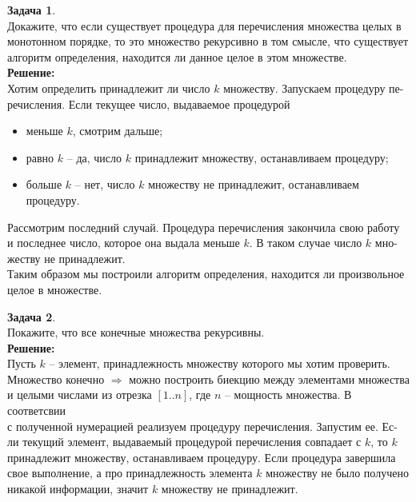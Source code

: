 \documentclass[a4paper,12pt]{article}
\theoremstyle{definition} %
\theoremstyle{definition} %
\newtheorem{problem}{Задача}[section]
\theoremstyle{remark} %
\begin{document}
\begin{problem}\ \\[1ex]
	Докажите, что если существует процедура для перечисления множества целых в \\[1ex] 
	монотонном порядке, то это множество рекурсивно в том смысле, что существует \\[1ex]
	алгоритм определения, находится ли данное целое в
	этом множестве. \\[2ex]
	
	\textbf{Решение:} \\[2ex]
	Хотим определить принадлежит ли число $k$ множеству. Запускаем процедуру пе- \\[1ex]
	речисления. Если текущее число, выдаваемое процедурой 
	\begin{itemize}
		\item меньше $k$, смотрим дальше;
		\item равно $k$ -- да, число $k$ принадлежит множеству, останавливаем процедуру;
		\item больше $k$ -- нет, число $k$ множеству не принадлежит, останавливаем процедуру.
	\end{itemize}
	Рассмотрим последний случай. Процедура перечисления закончила свою работу \\[1ex]
	и последнее число, которое она выдала меньше $k$. В таком случае число $k$ мно- \\[1ex]
	жеству не принадлежит. \\[1ex]
	Таким образом мы построили алгоритм определения, находится ли произвольное \\[1ex]
	целое в множестве. \\[4ex]
\end{problem}

\begin{problem}\ \\[1ex]
	Покажите, что все конечные множества рекурсивны. \\[2ex]
	
	\textbf{Решение:} \\[2ex]
	Пусть $k$ -- элемент, принадлежность множеству которого мы хотим проверить. \\[1ex]
	Множество конечно $\Rightarrow$ можно построить биекцию между элементами множества \\[1ex] 
	и целыми числами из отрезка	$[1..n]$, где $n$ -- мощность множества. В соответсвии \\[1ex] 
	с полученной нумерацией реализуем процедуру перечисления. Запустим ее. Ес- \\[1ex]
	ли текущий элемент, выдаваемый процедурой перечисления совпадает с $k$, то $k$ \\[1ex]
	принадлежит множеству, останавливаем процедуру. Если процедура завершила \\[1ex]
	свое выполнение, а про принадлежность элемента $k$ множеству не было получено \\[1ex]
	никакой информации, значит $k$ множеству не принадлежит.
\end{problem}
\end{document}
